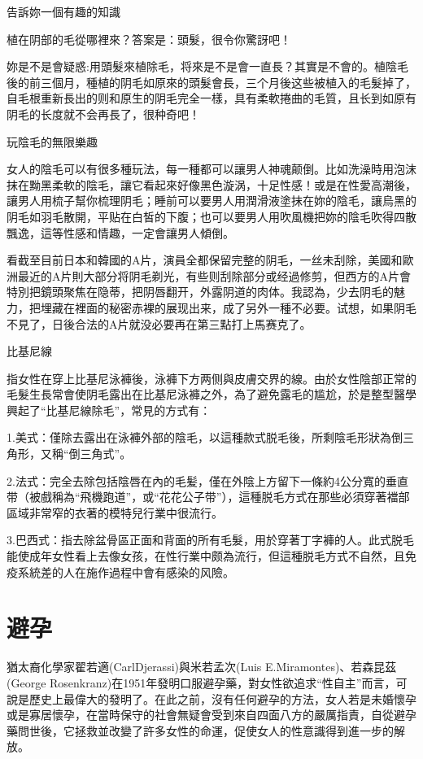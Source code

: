 \documentclass[12pt,UTF8]{ctexbook}
\begin{document}
告訴妳一個有趣的知識

植在阴部的毛從哪裡來？答案是：頭髮，很令你驚訝吧！

妳是不是會疑惑:用頭髮來植除毛，将來是不是會一直長？其實是不會的。植陰毛後的前三個月，種植的阴毛如原來的頭髮會長，三个月後这些被植入的毛髮掉了，自毛根重新長出的则和原生的阴毛完全一樣，具有柔軟捲曲的毛質，且长到如原有阴毛的长度就不会再長了，很种奇吧！

玩陰毛的無限樂趣

女人的陰毛可以有很多種玩法，每一種都可以讓男人神魂颠倒。比如洗澡時用泡沫抹在黝黑柔軟的陰毛，讓它看起來好像黑色漩涡，十足性感！或是在性愛高潮後，讓男人用梳子幫你梳理阴毛；睡前可以要男人用潤滑液塗抹在妳的陰毛，讓烏黑的阴毛如羽毛散開，平贴在白皙的下腹；也可以要男人用吹風機把妳的陰毛吹得四散飄逸，這等性感和情趣，一定會讓男人傾倒。

看截至目前日本和韓國的A片，演員全都保留完整的阴毛，一丝未刮除，美國和歐洲最近的A片則大部分将阴毛剃光，有些则刮除部分或经過修剪，但西方的A片會特別把鏡頭聚焦在隐蒂，把阴唇翻开，外露阴道的肉体。我認為，少去阴毛的魅力，把埋藏在裡面的秘密赤裸的展现出来，成了另外一種不必要。试想，如果阴毛不見了，日後合法的A片就没必要再在第三點打上馬赛克了。

比基尼線

指女性在穿上比基尼泳褲後，泳褲下方两侧與皮膚交界的線。由於女性陰部正常的毛髮生長常會使阴毛露出在比基尼泳褲之外，為了避免露毛的尴尬，於是整型醫學興起了“比基尼線除毛”，常見的方式有：

1.美式：僅除去露出在泳褲外部的陰毛，以這種款式脱毛後，所剩陰毛形狀為倒三角形，又稱“倒三角式”。

2.法式：完全去除包括陰唇在內的毛髪，僅在外陰上方留下一條約4公分寬的垂直带（被戲稱為“飛機跑道”，或“花花公子带”），這種脱毛方式在那些必須穿著襠部區域非常窄的衣著的模特兒行業中很流行。

3.巴西式：指去除盆骨區正面和背面的所有毛髮，用於穿著丁字褲的人。此式脱毛能使成年女性看上去像女孩，在性行業中颇為流行，但這種脱毛方式不自然，且免疫系統差的人在施作過程中會有感染的风險。

\chapter{避孕}

猶太裔化學家翟若適(CarlDjerassi)與米若孟次(Luis E.Miramontes)、若森昆茲(George Rosenkranz)在1951年發明口服避孕藥，對女性欲追求“性自主”而言，可說是歷史上最偉大的發明了。在此之前，沒有任何避孕的方法，女人若是未婚懷孕或是寡居懷孕，在當時保守的社會無疑會受到來自四面八方的嚴厲指責，自從避孕藥問世後，它拯救並改變了許多女性的命運，促使女人的性意識得到進一步的解放。
\end{document}
